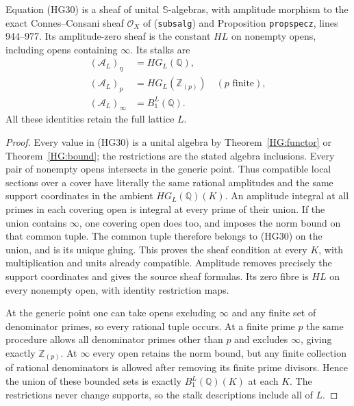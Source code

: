 \begin{theorem}\label{HG:sheaf}
Equation (HG30) is a sheaf of unital $\mathbb S$-algebras, with
amplitude morphism to the exact Connes--Consani sheaf
$\mathcal O_X$ of (\texttt{subsalg}) and Proposition
\texttt{propspecz}, lines 944--977.  Its amplitude-zero sheaf
is the constant $HL$ on nonempty opens, including opens
containing $\infty$.  Its stalks are
\begin{equation}\tag{HG31}
 \begin{aligned}
 (\mathcal A_L)_\eta&=HG_L(\mathbb Q),\\
 (\mathcal A_L)_p&=HG_L(\mathbb Z_{(p)})\quad(p\text{ finite}),\\
 (\mathcal A_L)_\infty&=B_1^L(\mathbb Q).
 \end{aligned}
\end{equation}
All these identities retain the full lattice $L$.
\end{theorem}
\begin{proof}
Every value in (HG30) is a unital algebra by
Theorem~\ref{HG:functor} or Theorem~\ref{HG:bound}; the restrictions
are the stated algebra inclusions.  Every pair of nonempty
opens intersects in the generic point.  Thus compatible local
sections over a cover have literally the same rational
amplitudes and the same support coordinates in the ambient
$HG_L(\mathbb Q)(K)$.  An amplitude integral at all primes
in each covering open is integral at every prime of their
union.  If the union contains $\infty$, one covering open
does too, and imposes the norm bound on that common tuple.
The common tuple therefore belongs to (HG30) on the union,
and is its unique gluing.  This proves the sheaf condition at
every $K$, with multiplication and units already compatible.
Amplitude removes precisely the support coordinates and gives
the source sheaf formulas.  Its zero fibre is $HL$ on every
nonempty open, with identity restriction maps.

At the generic point one can take opens excluding $\infty$
and any finite set of denominator primes, so every rational
tuple occurs.  At a finite prime $p$ the same procedure allows
all denominator primes other than $p$ and excludes $\infty$,
giving exactly $\mathbb Z_{(p)}$.  At $\infty$ every open
retains the norm bound, but any finite collection of rational
denominators is allowed after removing its finite prime
divisors.  Hence the union of these bounded sets is exactly
$B_1^L(\mathbb Q)(K)$ at each $K$.  The restrictions never
change supports, so the stalk descriptions include all of $L$.
\end{proof}

